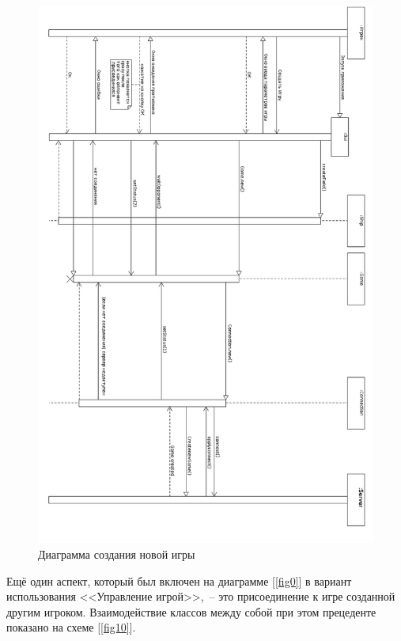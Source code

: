 \begin{figure}[pt]
\centering
\includegraphics[width=15cm]{images/CRG.png}
\caption{Диаграмма создания новой игры}
\label{fig9}
\end{figure}


Ещё один аспект, который был включен на диаграмме [\ref{fig0}] в вариант использования <<Управление игрой>>,~-- это присоединение к игре созданной другим игроком. Взаимодействие классов между собой при этом прецеденте показано на схеме [\ref{fig10}].

